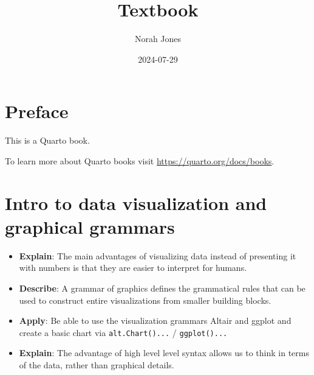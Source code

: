 \documentclass[
  letterpaper,
  DIV=11,
  numbers=noendperiod]{scrreprt}
\title{Textbook}
\author{Norah Jones}
\date{2024-07-29}
\renewcommand*\contentsname{Table of contents}
\newcommand\contentsname{Table of contents}
\begin{document}
\maketitle

\renewcommand*\contentsname{Table of contents}
{
\hypersetup{linkcolor=}
\setcounter{tocdepth}{2}
\tableofcontents
}

\chapter*{Preface}\label{preface}


This is a Quarto book.

To learn more about Quarto books visit
\url{https://quarto.org/docs/books}.


\chapter{Intro to data visualization and graphical
grammars}\label{intro-to-data-visualization-and-graphical-grammars}

\begin{tcolorbox}[enhanced jigsaw, title=\textcolor{quarto-callout-note-color}{\faInfo}\hspace{0.5em}{Learning outcomes}, colframe=quarto-callout-note-color-frame, colbacktitle=quarto-callout-note-color!10!white, titlerule=0mm, left=2mm, coltitle=black, toprule=.15mm, colback=white, opacityback=0, bottomtitle=1mm, rightrule=.15mm, bottomrule=.15mm, leftrule=.75mm, arc=.35mm, toptitle=1mm, breakable, opacitybacktitle=0.6]

\begin{itemize}
\item
  \textbf{Explain}: The main advantages of visualizing data instead of
  presenting it with numbers is that they are easier to interpret for
  humans.
\item
  \textbf{Describe}: A grammar of graphics defines the grammatical rules
  that can be used to construct entire visualizations from smaller
  building blocks.
\item
  \textbf{Apply}: Be able to use the visualization grammars Altair and
  ggplot and create a basic chart via \texttt{alt.Chart()...} /
  \texttt{ggplot()...}
\item
  \textbf{Explain}: The advantage of high level level syntax allows us
  to think in terms of the data, rather than graphical details.
\end{itemize}

\end{tcolorbox}
\end{document}

